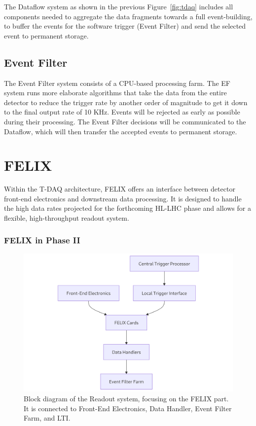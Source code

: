 The Dataflow system \cite{tdaq} as shown in the previous Figure~\ref{fig:tdaq} includes all components needed to aggregate the data fragments towards a full event-building, to buffer the events for the software trigger (Event Filter) and send the selected event to permanent storage.

\subsection{Event Filter}

The Event Filter system \cite{tdaq} consists of a CPU-based processing farm. The EF system runs more elaborate algorithms that take the data from the entire detector to reduce the trigger rate by another order of magnitude to get it down to the final output rate of 10 KHz. Events will be rejected as early as possible during their processing. The Event Filter decisions will be communicated to the Dataflow, which will then transfer the accepted events to permanent storage.

\clearpage
\section{\acs{FELIX}}

Within the \acs{T-DAQ} architecture, \acs{FELIX} offers an interface between detector front-end electronics and downstream data processing. It is designed to handle the high data rates projected for the forthcoming HL-LHC phase and allows for a flexible, high-throughput readout system.

\subsubsection{\acs{FELIX} in Phase II}

\begin{figure}[H]
\centering
\includegraphics[width=\textwidth]{images/introduction/felix-block-diagram.png}
\caption[Block diagram of the Readout system]{Block diagram of the Readout system, focusing on the FELIX part. It is connected to Front-End Electronics, Data Handler, Event Filter Farm, and \acf{LTI}.}
\label{fig:felix-block-diagram}
\end{figure}

